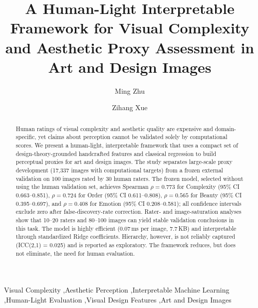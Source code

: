 \documentclass[preprint,12pt,authoryear]{elsarticle}
\begin{document}
\begin{frontmatter}

\title{A Human-Light Interpretable Framework for Visual Complexity and Aesthetic Proxy Assessment in Art and Design Images}

\author[addr1]{Ming Zhu}
\author[addr2]{Zihang Xue}

\address[addr1]{School of Art and Design, Henan University of Engineering, No.1 Xianghe Road, Longhu, Xinzheng, Zhengzhou, Henan 451191, China}
\address[addr2]{Department of Light Engineering, Qilu University of Technology, No.3501 Daxue Road, Changqing District, Jinan, Shandong 250353, China}

\begin{abstract}
Human ratings of visual complexity and aesthetic quality are expensive and domain-specific, yet claims about perception cannot be validated solely by computational scores. We present a human-light, interpretable framework that uses a compact set of design-theory-grounded handcrafted features and classical regression to build perceptual proxies for art and design images. The study separates large-scale proxy development (17,337 images with computational targets) from a frozen external validation on 100 images rated by 30 human raters. The frozen model, selected without using the human validation set, achieves Spearman $\rho = 0.773$ for Complexity (95\% CI 0.663--0.851), $\rho = 0.724$ for Order (95\% CI 0.611--0.808), $\rho = 0.565$ for Beauty (95\% CI 0.395--0.697), and $\rho = 0.408$ for Emotion (95\% CI 0.208--0.581); all confidence intervals exclude zero after false-discovery-rate correction. Rater- and image-saturation analyses show that 10--20 raters and 80--100 images can yield stable validation conclusions in this task. The model is highly efficient (0.07\,ms per image, 7.7\,KB) and interpretable through standardized Ridge coefficients. Hierarchy, however, is not reliably captured (ICC(2,1) = 0.025) and is reported as exploratory. The framework reduces, but does not eliminate, the need for human evaluation.
\end{abstract}

\begin{keyword}
Visual Complexity \sep Aesthetic Perception \sep Interpretable Machine Learning \sep Human-Light Evaluation \sep Visual Design Features \sep Art and Design Images
\end{keyword}

\end{frontmatter}








\end{document}
